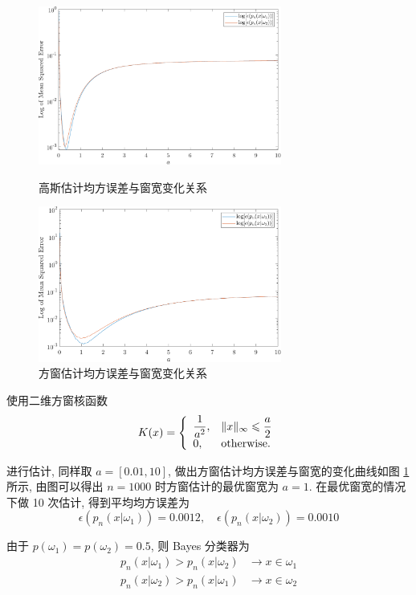 \documentclass{article}
\begin{document}
\begin{figure}[tbp]
  \centering
  \begin{minipage}[t]{0.48\textwidth}
  \centering
  \includegraphics[width=8cm]{mseGaussian.pdf}
  \caption{高斯估计均方误差与窗宽变化关系}
  \label{fig:mseGaussian}
  \end{minipage}
  \begin{minipage}[t]{0.48\textwidth}
  \centering
  \includegraphics[width=8cm]{mseCube.pdf}
  \caption{方窗估计均方误差与窗宽变化关系}
  \label{fig:mseCube}
  \end{minipage}
\end{figure}

使用二维方窗核函数
\begin{equation}
  K(x)=
  \left\{
    \begin{array}{ll}
      \dfrac{1}{a^2},& \|x\|_\infty \leqslant\dfrac{a}{2} \\
      0, & \text{otherwise.}
    \end{array}
  \right.
\end{equation}

进行估计, 同样取 $a=[0.01,10]$, 做出方窗估计均方误差与窗宽的变化曲线如图 \ref{fig:mseCube} 所示, 由图可以得出 $n=1000$ 时方窗估计的最优窗宽为 $a=1$. 在最优窗宽的情况下做 10 次估计, 得到平均均方误差为
\begin{equation}
  \epsilon(p_n(x|\omega_1))=0.0012,\quad\epsilon(p_n(x|\omega_2))=0.0010
\end{equation}

由于 $p(\omega_{1})=p(\omega_{2})= 0.5$, 则 Bayes 分类器为
\begin{equation}
  \begin{aligned}
    p_n(x|\omega_1) > p_n(x|\omega_2) &\to x\in\omega_1\\
    p_n(x|\omega_2) > p_n(x|\omega_1) &\to x\in\omega_2\\
  \end{aligned}
\end{equation}
\end{document}
